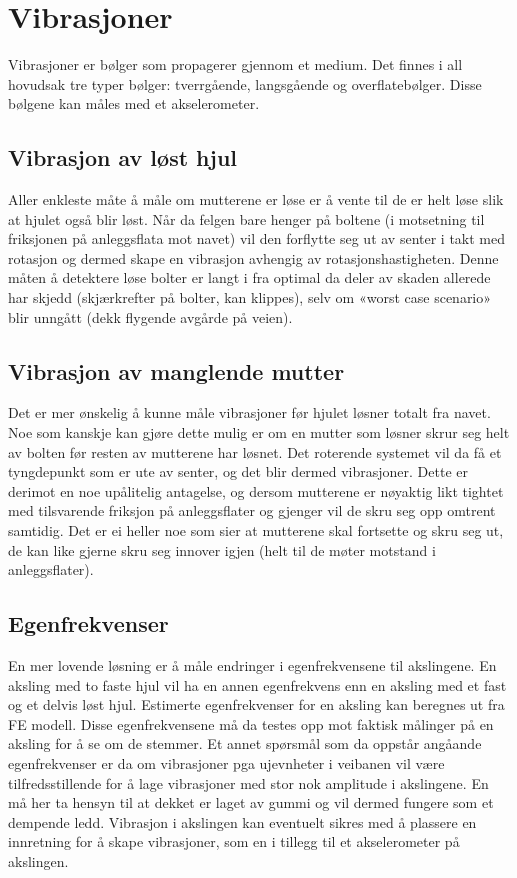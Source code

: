 \section{Vibrasjoner}
Vibrasjoner er bølger som propagerer gjennom et medium. Det finnes i 
all hovudsak tre typer bølger: tverrgående, langsgående og overflatebølger. 
Disse bølgene kan måles med et akselerometer.

\subsection{Vibrasjon av løst hjul}
Aller enkleste måte å måle om mutterene er løse er å vente til 
de er helt løse slik at hjulet også blir løst. Når da felgen bare 
henger på boltene (i motsetning til friksjonen på anleggsflata 
mot navet) vil den forflytte seg ut av senter i takt med rotasjon 
og dermed skape en vibrasjon avhengig av rotasjonshastigheten. 
Denne måten å detektere løse bolter er langt i fra optimal da deler 
av skaden allerede har skjedd (skjærkrefter på bolter, kan klippes),
 selv om «worst case scenario» blir unngått (dekk flygende avgårde på veien).

\subsection{Vibrasjon av manglende mutter}
Det er mer ønskelig å kunne måle vibrasjoner før hjulet løsner totalt
fra navet. Noe som kanskje kan gjøre dette mulig er om en mutter som løsner
skrur seg helt av bolten før resten av mutterene har løsnet. Det roterende systemet vil
da få et tyngdepunkt som er ute av senter, og det blir dermed vibrasjoner.
Dette er derimot en noe upålitelig antagelse, og dersom mutterene er nøyaktig
likt tightet med tilsvarende friksjon på anleggsflater og gjenger vil de skru seg opp omtrent samtidig.
Det er ei heller noe som sier at mutterene skal fortsette og skru seg ut, de kan like 
gjerne skru seg innover igjen (helt til de møter motstand i anleggsflater).

\subsection{Egenfrekvenser}
En mer lovende løsning er å måle endringer i egenfrekvensene til 
akslingene. En aksling med to faste hjul vil ha en annen egenfrekvens 
enn en aksling med et fast og et delvis løst hjul. Estimerte egenfrekvenser 
for en aksling kan beregnes ut fra FE modell. Disse egenfrekvensene må 
da testes opp mot faktisk målinger på en aksling for å se om de stemmer. 
Et annet spørsmål som da oppstår angåande egenfrekvenser er da om 
vibrasjoner pga ujevnheter i veibanen vil være tilfredsstillende for å lage 
vibrasjoner med stor nok amplitude i akslingene. En må her ta hensyn til 
at dekket er laget av gummi og vil dermed fungere som et dempende ledd. 
Vibrasjon i akslingen kan eventuelt sikres med å plassere en innretning for 
å skape vibrasjoner, som en i tillegg til et akselerometer på akslingen.
